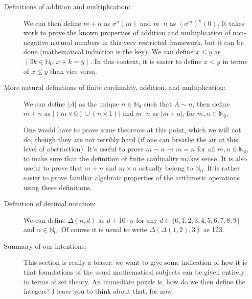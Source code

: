 \documentclass[12pt]{article}
\begin{document}
\begin{description}
\begin{description}
\end{description}

\item[Definitions of addition and multiplication:]  We can then define $m+n$ as $\sigma^n(m)$ and $m \cdot n$ as $(\sigma^m)^n(0)$.  It takes work to prove the known properties of addition and multiplication of non-negative natural numbers in this very restricted framework, but it can be done (mathematical induction is the key).  We can define $x \leq y$ as $(\exists k \in \mathbb N_0:x+k=y)$.  In this context, it is easier to define $x <y$ in terms of $x \leq y$ than vice versa.

\item[More natural definitions of finite cardinality, addition, and multiplication:]  We can define $|A|$ as the unique $n \in \mathbb N_0$ such that $A \sim n$, then define $m+n$ as $|(m \times 0) \cup (n \times 1)|$ and $m \cdot n$ as $|m \times n|$, for $m,n \in \mathbb N_0$.

One would have to prove some theorems at this point, which we will not do, though they are not terribly hard (if one can breathe the air at this level of abstraction).  It's useful to prove $m \sim n \rightarrow m=n$ for all $m,n \in \mathbb N_0$, to make sure that the definition of finite cardinality makes sense.  It is also useful to prove that $m+n$ and $m \times n$ actually belong to $\mathbb N_0$.  It is rather easier to prove familiar algebraic properties of the arithmetic operations using these definitions.

\item[Definition of decimal notation:]  We can define $\Delta(n,d)$ as $d+10\cdot n$ for any $d \in \{0,1,2,3,4,5,6,7,8,9\}$ and
$n \in \mathbb N_0$.  Of course it is usual to write $\Delta(\Delta(1,2),3)$ as 123.

\item[Summary of our intentions:]  This section is really a teaser:  we want to give some indication of how it is that foundations of the usual mathematical subjects can be given entirely in terms of set theory.  An immediate puzzle is, how do we then define the integers?  I leave you to think about that, for now.


\end{description}
\end{document}
